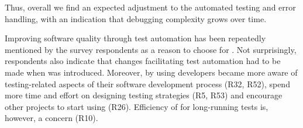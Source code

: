 Thus, overall we find an expected adjustment to the automated testing and 
error handling, with an indication that debugging complexity grows over time.




Improving software quality through test automation has been repeatedly mentioned by the survey respondents as a reason to choose for \Tvis. 
Not surprisingly, respondents also indicate that changes facilitating test automation had to be made when \Tvis was introduced. 
Moreover, by using \Tvis developers became more aware of testing-related aspects of their software development process (R32, R52), 
spend more time and effort on designing testing strategies (R5, R53) and encourage other projects to start using \Tvis (R26).
Efficiency of \Tvis for long-running tests is, however, a concern (R10).


